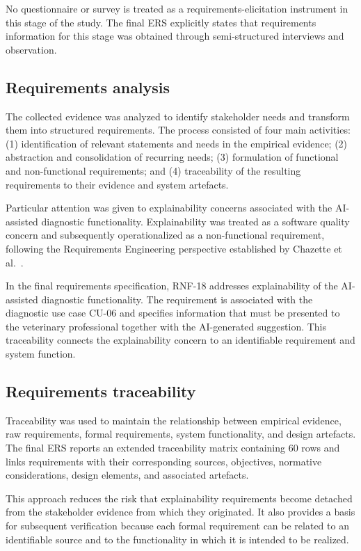 \documentclass[pdflatex,sn-mathphys-num,Numbered]{sn-jnl}
\begin{document}
No questionnaire or survey is treated as a requirements-elicitation instrument in this stage of the study. The final ERS explicitly states that requirements information for this stage was obtained through semi-structured interviews and observation.

\subsection{Requirements analysis}\label{subsec5}

The collected evidence was analyzed to identify stakeholder needs and transform them into structured requirements. The process consisted of four main activities: (1) identification of relevant statements and needs in the empirical evidence; (2) abstraction and consolidation of recurring needs; (3) formulation of functional and non-functional requirements; and (4) traceability of the resulting requirements to their evidence and system artefacts.

Particular attention was given to explainability concerns associated with the AI-assisted diagnostic functionality. Explainability was treated as a software quality concern and subsequently operationalized as a non-functional requirement, following the Requirements Engineering perspective established by Chazette et al.~\cite{chazette2020,chazette2021,chazette2022}.

In the final requirements specification, RNF-18 addresses explainability of the AI-assisted diagnostic functionality. The requirement is associated with the diagnostic use case CU-06 and specifies information that must be presented to the veterinary professional together with the AI-generated suggestion. This traceability connects the explainability concern to an identifiable requirement and system function.

\subsection{Requirements traceability}\label{subsec6}

Traceability was used to maintain the relationship between empirical evidence, raw requirements, formal requirements, system functionality, and design artefacts. The final ERS reports an extended traceability matrix containing 60 rows and links requirements with their corresponding sources, objectives, normative considerations, design elements, and associated artefacts.

This approach reduces the risk that explainability requirements become detached from the stakeholder evidence from which they originated. It also provides a basis for subsequent verification because each formal requirement can be related to an identifiable source and to the functionality in which it is intended to be realized.
\end{document}

